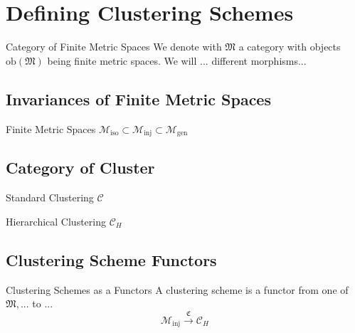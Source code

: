 \chapter{Defining Clustering Schemes}

\begin{notation}{Category of Finite Metric Spaces}{}
We denote with $\mathfrak{M}$ a category with objects $\mathrm{ob}(\mathfrak{M})$ being finite metric spaces. We will ... different morphisms...
\end{notation}

\section{Invariances of Finite Metric Spaces}

\begin{definition}{Finite Metric Spaces}{}
$\mathscr{M}_\mathrm{iso} \subset \mathscr{M}_\mathrm{inj} \subset \mathscr{M}_\mathrm{gen}$
\end{definition}

\section{Category of Cluster}

\begin{definition}{Standard Clustering}{}
$\mathscr{C}$
\end{definition}

\begin{definition}{Hierarchical Clustering}{}
$\mathscr{C}_H$
\end{definition}

\section{Clustering Scheme Functors}

\begin{definition}{Clustering Schemes as a Functors}{}
A clustering scheme is a functor from one of $\mathfrak{M}, ...$ to $...$
$$\mathscr{M}_\mathrm{inj} \overset{\mathfrak{C}}{\longrightarrow} \mathscr{C}_H$$
\end{definition}

